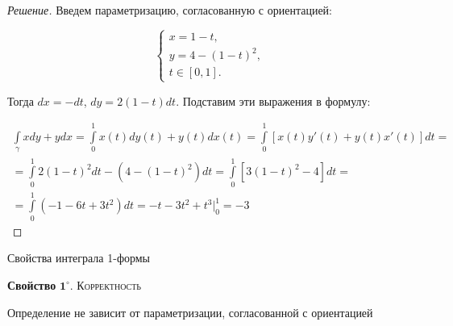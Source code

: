 \documentclass[a5paper]{article}
\theoremstyle{plain}
\theoremstyle{definition}
\numberwithin{through}{section}
\numberwithin{equation}{section}
\begin{document}
\begin{proof}[Решение]
	Введем параметризацию, согласованную с ориентацией:
	
	\begin{equation*}
		\begin{cases}
			x = 1 - t,\\
			y = 4 - (1 - t)^2, \\
			t \in [0, 1].
		\end{cases}
	\end{equation*}
	
	Тогда $dx=-dt$, $dy=2(1-t)dt$. Подставим эти выражения в формулу:
	
	\begin{multline*}
		\int\limits_{\gamma} xdy+ydx = \int\limits_{0}^{1}x(t)dy(t)+y(t)dx(t) = \int\limits_{0}^{1} [x(t)y'(t) + y(t)x'(t)]dt  = \\ = \int\limits_{0}^{1} 2(1-t)^2dt - (4 - (1-t)^2)dt = \int\limits_{0}^{1} [3(1-t)^2 - 4]dt = \\ =  \int\limits_{0}^{1} (-1 - 6t + 3t^2)dt = -t-3t^2+t^3 \bigg|_0^1 = -3
	\end{multline*}
\end{proof}

Свойства интеграла 1-формы


	{\bf Свойство} $\mathbf{1^\circ.}$
	{\textsc{Корректность}}
	
	Определение не зависит от параметризации, согласованной с ориентацией
	
\end{document}
